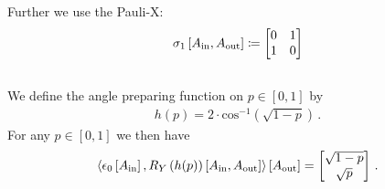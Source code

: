 \documentclass[aps,onecolumn,nofootinbib,pra]{article}
\newtheorem{definition}{Definition}
\begin{document}
    Further we use the Pauli-X:
    \begin{align*}
        \sigma_1\left[A_{\mathrm{in}},A_{\mathrm{out}}\right] \coloneqq
        \begin{bmatrix}
            0 & 1 \\
            1 & 0
        \end{bmatrix}
    \end{align*}


%

    \subsection{\ActivationCircuit{}}

    We define the angle preparing function on $p\in[0,1]$ by
    \begin{align*}
        h(p) = 2 \cdot \mathrm{cos}^{-1}\left(\sqrt{1-p}\right) \, .
    \end{align*}
    For any $p\in[0,1]$ we then have
    \begin{align*}
        \left\langle \epsilon_{0}\left[A_{\mathrm{in}}\right],R_Y\left({h(p)}\right)\left[A_{\mathrm{in}},A_{\mathrm{out}}\right]\right\rangle \left[ A_{\mathrm{out}} \right]
        = \begin{bmatrix}
              \sqrt{1-p} \\
              \sqrt{p}
        \end{bmatrix} \, .
    \end{align*}
\end{document}
